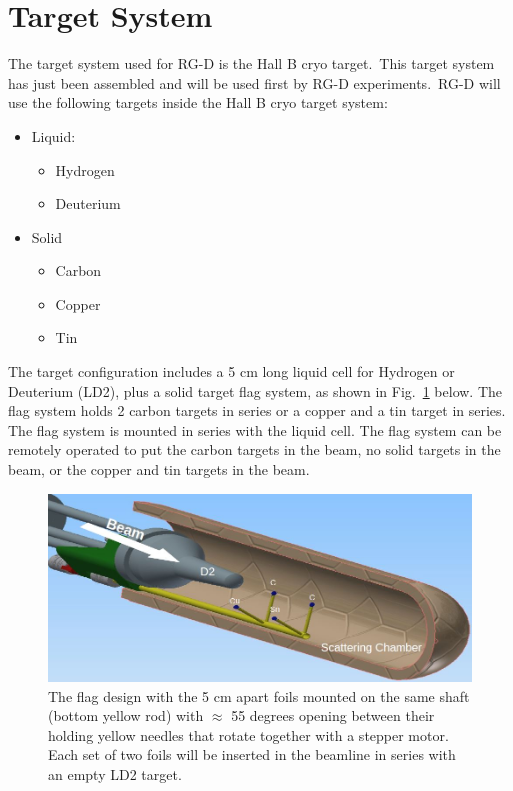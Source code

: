 \section{Target System}

The target system used for RG-D is the Hall B cryo target.~This target system has just been assembled and will be used first by RG-D experiments.~RG-D will use the following targets inside the Hall B cryo target system:

\begin{itemize}
\item	Liquid:
   \begin{itemize}
	\item	Hydrogen
	\item	Deuterium
    \end{itemize}
\item		Solid
   \begin{itemize}
	\item	Carbon
	\item	Copper
	\item	Tin
   \end{itemize}
\end{itemize}

The target configuration includes a 5 cm long liquid cell for Hydrogen or Deuterium (LD2), plus a solid target flag system, as shown in Fig.~\ref{fig:rgd-target} below. The flag system holds 2 carbon targets in series or a copper and a tin target in series.  The flag system is mounted in series with the liquid cell. The flag system can be remotely operated to put the carbon targets in the beam, no solid targets in the beam, or the copper and tin targets in the beam.

\begin{figure}\centering
  \includegraphics[width=\textwidth]{pics/rgd-target.jpg}
  \caption{The flag design with the 5 cm apart foils mounted on the same shaft (bottom yellow rod) with $\approx$ 55 degrees opening between their holding yellow needles that rotate together with a stepper motor. Each set of two foils will be inserted in the beamline in series with an empty LD2 target.\label{fig:rgd-target}}
\end{figure}

